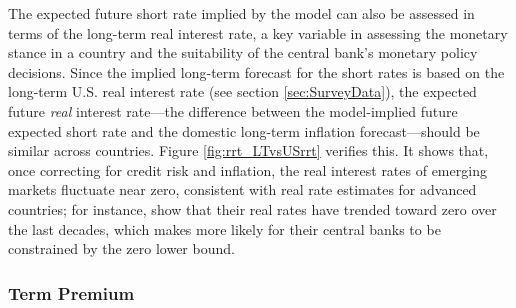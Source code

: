 {%

The expected future short rate implied by the model can also be assessed in terms of the long-term real interest rate, a key variable in assessing the monetary stance in a country and the suitability of the central bank's monetary policy decisions.
Since the implied long-term forecast for the short rates 
is based on the long-term U.S. real interest rate (see section \ref{sec:SurveyData}), the expected future \textit{real} interest rate---the difference between the model-implied future expected short rate and the domestic long-term inflation forecast---should be similar across countries.
Figure \ref{fig:rrt_LTvsUSrrt} verifies this.
It shows that, once correcting for credit risk and inflation, the real interest rates of emerging markets fluctuate near zero, consistent with real rate estimates for advanced countries; for instance,
\cite{HolstonLaubachWilliams:2017} show that their real  rates have trended toward zero over the last decades, which makes more likely for their central banks to be constrained by the zero lower bound.

\subsubsection{Term Premium} \label{sec:TP}
\iftoggle{toclinks}{\gototoc}{} %

}
